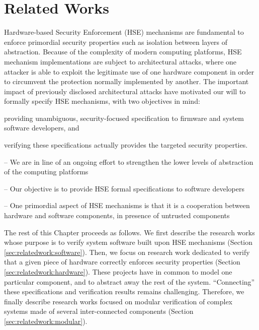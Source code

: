 \chapter{Related Works}
\label{chapter:relatedwork}

Hardware-based Security Enforcement (HSE) mechanisms are fundamental to enforce
primordial security properties such as isolation between layers of abstraction.
%
Because of the complexity of modern computing platforms, HSE mechanism
implementations are subject to architectural attacks, where one attacker is able
to exploit the legitimate use of one hardware component in order to circumvent
the protection normally implemented by another.
%
The important impact of previously disclosed architectural attacks have
motivated our will to formally specify HSE mechanisms, with two objectives in
mind:
%
\begin{inparaenum}[(1)]
\item providing unambiguous, security-focused specification to firmware and
  system software developers, and
%
\item verifying these specifications actually provides the targeted security
  properties.
\end{inparaenum}

\begin{compactitem}
\item[--] We are in line of an ongoing effort to strengthen the lower levels of
  abstraction of the computing
  platforms\,\cite{potlapally2011hardwaresecurity,chong2016report}
\item[--] Our objective is to provide HSE formal specifications to software
  developers
\item[--] One primordial aspect of HSE mechanisms is that it is a cooperation
  between hardware and software components, in presence of untrusted components
\end{compactitem}

The rest of this Chapter proceeds as follows.
%
We first describe the research works whose purpose is to verify system software
built upon HSE mechanisms (Section\,\ref{sec:relatedwork:software}).
%
Then, we focus on research work dedicated to verify that a given piece of
hardware correctly enforces security properties
(Section\,\ref{sec:relatedwork:hardware}).
%
These projects have in common to model one particular component, and to abstract
away the rest of the system.
%
``Connecting'' these specifications and verification results remains
challenging.
%
Therefore, we finally describe research works focused on modular verification of
complex systems made of several inter-connected components
(Section\,\ref{sec:relatedwork:modular}).

